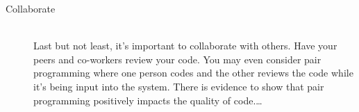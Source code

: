 \documentclass[12pt,a4paper,oneside,draft]{article}
\begin{document}
\begin{description}
   \item[Collaborate] \hfill \\
   Last but not least, it's important to collaborate with others. Have your peers and co-workers review your code. You may even consider pair programming where one person codes and the other reviews the code while it's being input into the system. There is evidence to show that pair programming positively impacts the quality of code.\ldots
\end{description}
\end{document}
